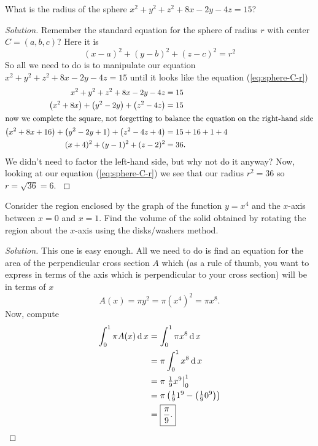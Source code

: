 \begin{problem}
What is the radius of the sphere $x^2+y^2+z^2+8x-2y-4z=15$?
\end{problem}
\begin{proof}[Solution]
Remember the standard equation for the sphere of radius $r$ with center
$C=(a,b,c)$? Here it is
\begin{equation}
\label{eq:sphere-C-r}
(x-a)^2+(y-b)^2+(z-c)^2=r^2
\end{equation}
So all we need to do is to manipulate our equation
$x^2+y^2+z^2+8x-2y-4z=15$ until it looks like the equation
(\ref{eq:sphere-C-r})
\begingroup
\allowdisplaybreaks
\begin{align*}
x^2+y^2+z^2+8x-2y-4z&=15\\
\left(x^2+8x\right)
+\left(y^2-2y\right)
+\left(z^2-4z\right)&=15\\
\intertext{now we complete the square, not forgetting to balance the
  equation on the right-hand side}
\left(x^2+8x+16\right)
+\left(y^2-2y+1\right)
+\left(z^2-4z+4\right)&=15+16+1+4\\
(x+4)^2+(y-1)^2+(z-2)^2&=36.
\end{align*}
We didn't need to factor the left-hand side, but why not do it anyway? Now,
looking at our equation (\ref{eq:sphere-C-r}) we see that our radius
$r^2=36$ so $\boxed{r=\sqrt{36}=6}$.
\endgroup
\end{proof}

\begin{problem}
Consider the region enclosed by the graph of the function $y=x^4$ and the
$x$-axis between $x=0$ and $x=1$. Find the volume of the solid obtained by
rotating the region about the $x$-axis using the disks/washers method.
\end{problem}
\begin{proof}[Solution]
This one is easy enough. All we need to do is find an equation for the area
of the perpendicular cross section $A$ which (as a rule of thumb, you want
to express in terms of the axis which is perpendicular to your cross
section) will be in terms of $x$
\[
A(x)=\pi y^2=\pi\left(x^4\right)^2=\pi x^8.
\]
Now, compute
\begingroup
\allowdisplaybreaks
\begin{align*}
\int_0^1\pi A(x)\operatorname{d} x
&=\int_0^1\pi x^8\operatorname{d} x\\
&=\pi\int_0^1 x^8\operatorname{d} x\\
&=\pi\left.\tfrac{1}{9}x^9\right|_0^1\\
&=\pi\left(\tfrac{1}{9}1^9-\left(\tfrac{1}{9}0^9\right)\right)\\
&=\boxed{\frac{\pi}{9}.}\qedhere
\end{align*}
\endgroup
\end{proof}

